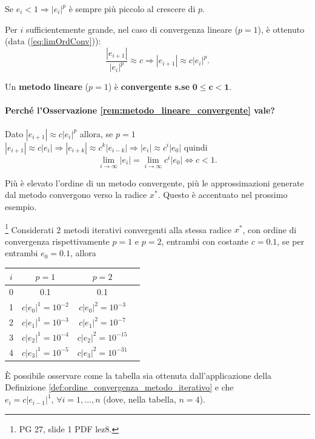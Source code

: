 \begin{remark}
	Se $e_i<1 \Rightarrow |e_i|^p$ è sempre più piccolo al crescere di $p$.
\end{remark}

\begin{remark}\label{rem:limOrdConv}
	Per $i$ sufficientemente grande, nel caso di convergenza lineare ($p=1$), è ottenuto (data (\ref{eq:limOrdConv})):
	\begin{equation*}
		\frac{|e_{i+1}|}{|e_i|^p}\approx c \Rightarrow |e_{i+1}|\approx c|e_i|^p.
	\end{equation*}
\end{remark}

\begin{remark}\label{rem:metodo_lineare_convergente}
	Un \textbf{metodo lineare} ($p=1$) è \textbf{convergente s.se} $\boldsymbol{0\leq c<1}$.
\end{remark}

\paragraph{Perché l'Osservazione \ref{rem:metodo_lineare_convergente} vale?} Dato $|e_{i+1}|\approx c|e_i|^p$ allora, se $p=1$ $|e_{i+1}|\approx c|e_i|\Rightarrow |e_{i+k}|\approx c^k|e_{i-k}|\Rightarrow |e_i|\approx c^i|e_0|$ quindi
\begin{equation*}
	\underset{i\to\infty}{\lim}|e_i|=\underset{i\to\infty}{\lim}{c^i|e_0|}\iff c<1.
\end{equation*}

Più è elevato l'ordine di un metodo convergente, più le approssimazioni generate dal metodo convergono verso la radice $x^*$. Questo è accentuato nel prossimo esempio.

\begin{example}
	\footnote{PG 27, slide 1 PDF lez8.} Considerati 2 metodi iterativi convergenti alla stessa radice $x^*$, con ordine di convergenza rispettivamente $p=1$ e $p=2$, entrambi con costante $c=0.1$, se per entrambi $e_0=0.1$, allora
	\begin{center}
		\begin{tabular}{ |c|c|c|c| } 
			\hline
			$i$ & $p=1$ & $p=2$ \\
			\hline
			0 & 0.1 & 0.1 \\ 
			1 & $c|e_0|^1=10^{-2}$ & $c|e_0|^2=10^{-3}$ \\ 
			2 & $c|e_1|^1=10^{-3}$ & $c|e_1|^2=10^{-7}$\\
			3 & $c|e_2|^1=10^{-4}$ & $c|e_2|^2=10^{-15}$\\
			4 & $c|e_3|^1=10^{-5}$ & $c|e_3|^2=10^{-31}$\\
			\hline
		\end{tabular}
	\end{center}
	
	È possibile osservare come la tabella sia ottenuta dall'applicazione della Definizione \ref{def:ordine_convergenza_metodo_iterativo} e che $e_i=c|e_{i-1}|^1,\, \forall i=1,\hdots , n$ (dove, nella tabella, $n=4$).
\end{example}

